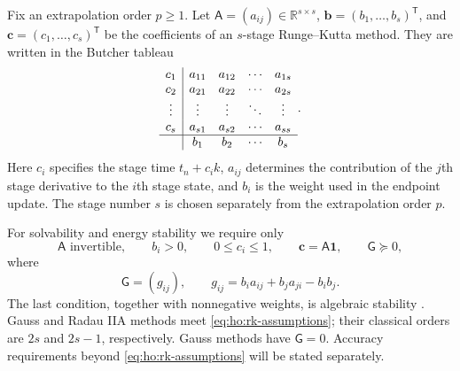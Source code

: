 \documentclass[11pt,a4paper]{article}
\newcommand{\bs}{\boldsymbol}
\theoremstyle{definition}
\numberwithin{equation}{section}
\begin{document}
Fix an extrapolation order $p\ge1$. Let
$\mathsf A=(a_{ij})\in\mathbb R^{s\times s}$,
$\boldsymbol b=(b_1,\ldots,b_s)^{\mathsf T}$, and
$\boldsymbol c=(c_1,\ldots,c_s)^{\mathsf T}$
be the coefficients of an $s$-stage Runge--Kutta method.
They are written in the Butcher tableau
\begin{equation}\label{eq:ho:butcher-tableau}
\begin{array}{c|cccc}
c_1    & a_{11} & a_{12} & \cdots & a_{1s} \\
c_2    & a_{21} & a_{22} & \cdots & a_{2s} \\
\vdots & \vdots & \vdots & \ddots & \vdots \\
c_s    & a_{s1} & a_{s2} & \cdots & a_{ss} \\
\hline
       & b_1    & b_2    & \cdots & b_s
\end{array}.
\end{equation}
Here $c_i$ specifies the stage time $t_n+c_i k$,
$a_{ij}$ determines the contribution of the $j$th stage
derivative to the $i$th stage state, and $b_i$ is the
weight used in the endpoint update.
The stage number $s$ is chosen separately from the
extrapolation order $p$.

For solvability
and energy stability we require only
\begin{equation}\label{eq:ho:rk-assumptions}
 \mathsf A\text{ invertible},\qquad b_i>0,\qquad
 0\le c_i\le1,\qquad \bs c=\mathsf A\bs1,\qquad \mathsf G\succeq0,
\end{equation}
where
\begin{equation}\label{eq:ho:G}
 \mathsf G=(g_{ij}),\qquad
 g_{ij}=b_i a_{ij}+b_j a_{ji}-b_i b_j.
\end{equation}
The last condition, together with nonnegative weights, is algebraic stability
\cite{HO_HairerWanner1996}. Gauss and Radau IIA methods meet
\eqref{eq:ho:rk-assumptions}; their classical orders are $2s$ and $2s-1$,
respectively. Gauss methods have $\mathsf G=0$. Accuracy requirements beyond
\eqref{eq:ho:rk-assumptions} will be stated separately.
\end{document}
